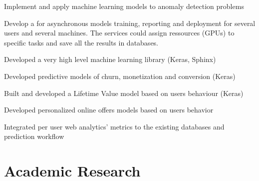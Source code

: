 \documentclass[]{deedy-resume-openfont}
\begin{document}
\begin{minipage}[t]{0.66\textwidth}
\vspace{\topsep} %
\begin{tightemize}
\item Implement and apply machine learning models to anomaly detection problems
\item Develop a  for asynchronous models training, reporting and deployment for several users and several machines. The services could assign ressources (GPUs) to specific tasks and save all the results in databases. \end{tightemize}

\sectionsep
{}
\begin{tightemize}
\item Developed a very high level machine learning library (Keras, Sphinx)\item Developed predictive models of churn, monetization and conversion (Keras) \item Built and developed a Lifetime Value model based on users behaviour (Keras) \end{tightemize}
\sectionsep

\begin{tightemize}
\item Developed personalized online offers models based on users behavior \item Integrated per user web analytics' metrics to the existing databases and prediction workflow \end{tightemize}
\sectionsep





\section{Academic Research}


\end{minipage}
\end{document}
